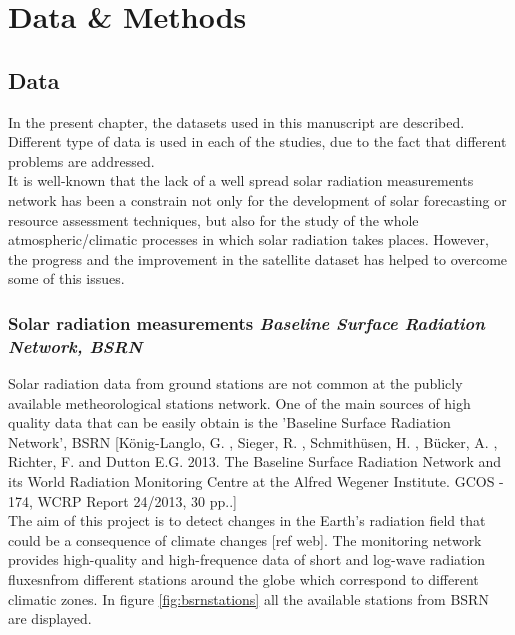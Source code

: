 \part{Data \& Methods\label{cha:data}}

\chapter{Data\label{cha:data}}

  In the present chapter, the datasets used in this manuscript are described. Different type of data is used in each of the studies, due to the fact that different problems are addressed.\\

  It is well-known that the lack of a well spread solar radiation measurements network has been a constrain not only for the development of solar forecasting or resource assessment techniques, but also for the study of the whole atmospheric/climatic processes in which solar radiation takes places. However, the progress and the improvement in the satellite dataset has helped to overcome some of this issues.\\

  \section{Solar radiation measurements \textit{Baseline Surface Radiation Network, BSRN}}

  Solar radiation data from ground stations are not common at the publicly available metheorological stations network. One of the main sources of high quality data that can be easily obtain is the 'Baseline Surface Radiation Network', BSRN [König-Langlo, G. , Sieger, R. , Schmithüsen, H. , Bücker, A. , Richter, F. and Dutton E.G. 2013. The Baseline Surface Radiation Network and its World Radiation Monitoring Centre at the Alfred Wegener Institute.
GCOS - 174, WCRP Report 24/2013, 30 pp..] \\

  The aim of this project is to detect changes in the Earth's radiation field that could be a consequence of climate changes [ref web]. The monitoring network provides high-quality and high-frequence data of short and log-wave radiation fluxesnfrom different stations around the globe which correspond to different climatic zones. In figure \ref{fig:bsrnstations} all the available stations from BSRN are displayed.\\

